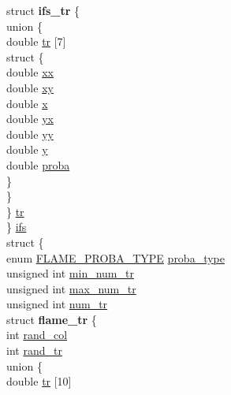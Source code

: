\begin{DoxyCompactItemize}
\begin{tabbing}
\>\>struct {\bfseries ifs\_tr} \{\\
\>\>\>union \{\\
\>\>\>\>double \hyperlink{structfractal_a2bb7ce1b69821aa883daf27d16df4ba5}{tr} \mbox{[}7\mbox{]}\\
\>\>\>\>struct \{\\
\>\>\>\>\>double \hyperlink{structfractal_a9f41ac4812a14dde576142eaba71141f}{xx}\\
\>\>\>\>\>double \hyperlink{structfractal_a5f558e90d4bc7b85f758e2f4e7b76fff}{xy}\\
\>\>\>\>\>double \hyperlink{structfractal_a25f9bab7277ce8cb9272a6e1ba1695f8}{x}\\
\>\>\>\>\>double \hyperlink{structfractal_aa52f4f35e4bd516179706f318397218a}{yx}\\
\>\>\>\>\>double \hyperlink{structfractal_abbf9466acf8986903f74754be308eb36}{yy}\\
\>\>\>\>\>double \hyperlink{structfractal_a4bd6ee4742f683f13141f31c2d3799b7}{y}\\
\>\>\>\>\>double \hyperlink{structfractal_a1de23626083977b508881c41a4122b4e}{proba}\\
\>\>\>\>\} \\
\>\>\>\} \\
\>\>\} \hyperlink{structfractal_ae239bfe9dc0e33b2ff7a615fff6104e4}{tr}\\
\>\} \hyperlink{structfractal_aa5cabd8d230694e71c055bdffb4031de}{ifs}\\
\>struct \{\\
\>\>enum \hyperlink{fconfig_8h_a3c25bb20d74e8283df9f607029400977}{FLAME\_PROBA\_TYPE} \hyperlink{structfractal_a9b098f5eee05e57395a2f389b76c5fd2}{proba\_type}\\
\>\>unsigned int \hyperlink{structfractal_aad5ae2034ecfc02aadbaed943874ae5e}{min\_num\_tr}\\
\>\>unsigned int \hyperlink{structfractal_a7f9433a0d1498384124c12e68b02935f}{max\_num\_tr}\\
\>\>unsigned int \hyperlink{structfractal_aba2914c84dcc1a96c49e4b91aade9d7f}{num\_tr}\\
\>\>struct {\bfseries flame\_tr} \{\\
\>\>\>int \hyperlink{structfractal_aae0e0d9ca8a4c89eb27abe85a3b7577c}{rand\_col}\\
\>\>\>int \hyperlink{structfractal_a955d2d4ebadac5d75dbeff34da5fce5c}{rand\_tr}\\
\>\>\>union \{\\
\>\>\>\>double \hyperlink{structfractal_a2bb7ce1b69821aa883daf27d16df4ba5}{tr} \mbox{[}10\mbox{]}\\

\end{tabbing}
\end{DoxyCompactItemize}
